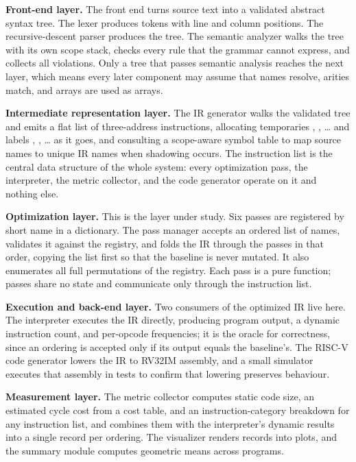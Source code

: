 \textbf{Front-end layer.} The front end turns source text into a validated abstract syntax tree. The lexer produces tokens with line and column positions. The recursive-descent parser produces the tree. The semantic analyzer walks the tree with its own scope stack, checks every rule that the grammar cannot express, and collects all violations. Only a tree that passes semantic analysis reaches the next layer, which means every later component may assume that names resolve, arities match, and arrays are used as arrays.

\textbf{Intermediate representation layer.} The IR generator walks the validated tree and emits a flat list of three-address instructions, allocating temporaries , , \ldots{} and labels , , \ldots{} as it goes, and consulting a scope-aware symbol table to map source names to unique IR names when shadowing occurs. The instruction list is the central data structure of the whole system: every optimization pass, the interpreter, the metric collector, and the code generator operate on it and nothing else.

\textbf{Optimization layer.} This is the layer under study. Six passes are registered by short name in a dictionary. The pass manager accepts an ordered list of names, validates it against the registry, and folds the IR through the passes in that order, copying the list first so that the baseline is never mutated. It also enumerates all full permutations of the registry. Each pass is a pure function; passes share no state and communicate only through the instruction list.

\textbf{Execution and back-end layer.} Two consumers of the optimized IR live here. The interpreter executes the IR directly, producing program output, a dynamic instruction count, and per-opcode frequencies; it is the oracle for correctness, since an ordering is accepted only if its output equals the baseline's. The RISC-V code generator lowers the IR to RV32IM assembly, and a small simulator executes that assembly in tests to confirm that lowering preserves behaviour.

\textbf{Measurement layer.} The metric collector computes static code size, an estimated cycle cost from a cost table, and an instruction-category breakdown for any instruction list, and combines them with the interpreter's dynamic results into a single record per ordering. The visualizer renders records into plots, and the summary module computes geometric means across programs.

